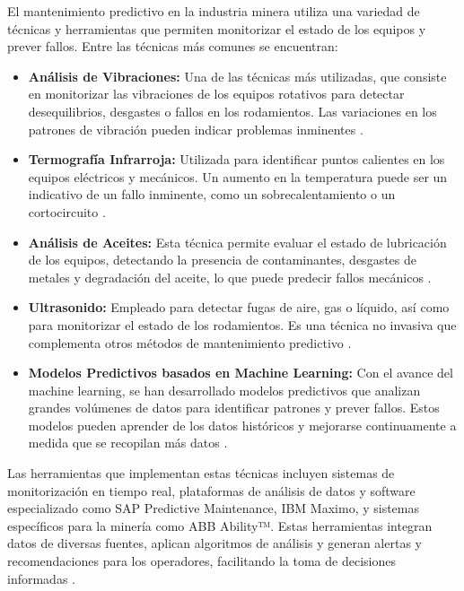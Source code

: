 El mantenimiento predictivo en la industria minera utiliza una variedad de técnicas y herramientas que permiten monitorizar el estado de los equipos y prever fallos. Entre las técnicas más comunes se encuentran:

\begin{itemize}
    \item \textbf{Análisis de Vibraciones:} Una de las técnicas más utilizadas, que consiste en monitorizar las vibraciones de los equipos rotativos para detectar desequilibrios, desgastes o fallos en los rodamientos. Las variaciones en los patrones de vibración pueden indicar problemas inminentes \cite{randall2011vibration}.
    \item \textbf{Termografía Infrarroja:} Utilizada para identificar puntos calientes en los equipos eléctricos y mecánicos. Un aumento en la temperatura puede ser un indicativo de un fallo inminente, como un sobrecalentamiento o un cortocircuito \cite{williamson2013infrared}.
    \item \textbf{Análisis de Aceites:} Esta técnica permite evaluar el estado de lubricación de los equipos, detectando la presencia de contaminantes, desgastes de metales y degradación del aceite, lo que puede predecir fallos mecánicos \cite{hewson2014oil}.
    \item \textbf{Ultrasonido:} Empleado para detectar fugas de aire, gas o líquido, así como para monitorizar el estado de los rodamientos. Es una técnica no invasiva que complementa otros métodos de mantenimiento predictivo \cite{saha2017ultrasound}.
    \item \textbf{Modelos Predictivos basados en Machine Learning:} Con el avance del machine learning, se han desarrollado modelos predictivos que analizan grandes volúmenes de datos para identificar patrones y prever fallos. Estos modelos pueden aprender de los datos históricos y mejorarse continuamente a medida que se recopilan más datos \cite{jardine2006machine}.
\end{itemize}

Las herramientas que implementan estas técnicas incluyen sistemas de monitorización en tiempo real, plataformas de análisis de datos y software especializado como SAP Predictive Maintenance, IBM Maximo, y sistemas específicos para la minería como ABB Ability™. Estas herramientas integran datos de diversas fuentes, aplican algoritmos de análisis y generan alertas y recomendaciones para los operadores, facilitando la toma de decisiones informadas \cite{mukherjee2020predictive}.

